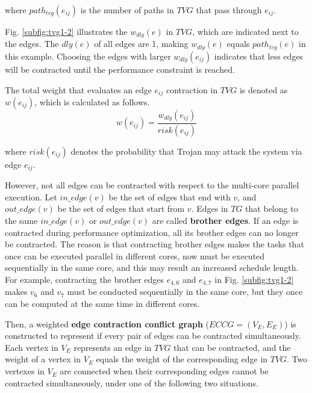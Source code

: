 \documentclass[10pt,journal]{IEEEtran}
\begin{document}
\noindent where $path_{tvg}(e_{ij})$ is the number of paths in $TVG$ that pass through $e_{ij}$.

Fig. \ref{subfig:tvg1-2} illustrates the $w_{dly}(e)$ in $TVG$, which are indicated next to the edges. The $dly(e)$ of all edges are 1, making $w_{dly}(e)$ equals $path_{tvg}(e)$ in this example. Choosing the edges with larger $w_{dly}(e_{ij})$ indicates that less edges will be contracted until the performance constraint is reached.








The total weight that evaluates an edge $e_{ij}$ contraction in $TVG$ is denoted as $w(e_{ij})$, which is calculated as follows.
\begin{equation}
w(e_{ij}) = \frac{w_{dly}(e_{ij})}{risk(e_{ij})}
\label{equ:weight_e}
\end{equation}

\noindent where $risk(e_{ij})$ denotes the probability that Trojan may attack the system via edge $e_{ij}$.

However, not all edges can be contracted with respect to the multi-core parallel execution. Let $in\_edge(v)$ be the set of edges that end with $v$, and $out\_edge(v)$ be the set of edges that start from $v$. Edges in $TG$ that belong to the same $in\_edge(v)$ or $out\_edge(v)$ are called \textbf{brother edges}. If an edge is contracted during performance optimization, all its brother edges can no longer be contracted. The reason is that contracting brother edges makes the tasks that once can be executed parallel in different cores, now must be executed sequentially in the same core, and this may result an increased schedule length. For example, contracting the brother edges $e_{4,6}$ and $e_{4,7}$ in Fig. \ref{subfig:tvg1-2} makes $v_6$ and $v_7$ must be conducted sequentially in the same core, but they once can be computed at the same time in different cores.




Then, a weighted \textbf{edge contraction conflict graph} ($ECCG=(V_E,E_E)$) is constructed to represent if every pair of edges can be contracted simultaneously. Each vertex in $V_E$ represents an edge in $TVG$ that can be contracted, and the weight of a vertex in $V_E$ equals the weight of the corresponding edge in $TVG$. Two vertexes in $V_E$ are connected when their corresponding edges cannot be contracted simultaneously, under one of the following two situations.
\end{document}
